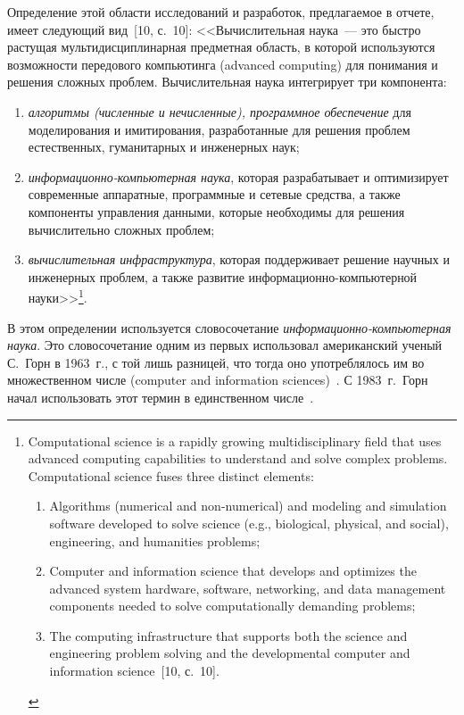 \begin{multicols}{2}
      Определение этой области исследований и разработок, предлагаемое в отчете, имеет
следующий вид~[10, с.~10]: <<Вычислительная наука~--- это быст\-ро растущая
мультидисциплинарная предметная область, в которой используются возможности передового
компьютинга (advanced computing) для понимания и решения сложных проблем.
Вы\-чис\-ли\-тель\-ная наука интегрирует три компонента:
      \begin{enumerate}[(1)]
\item \textit{алгоритмы (численные и нечисленные), про\-грам\-мное обеспечение} для
моделирования и имити\-ро\-ва\-ния, разработанные для решения проблем естественных,
гуманитарных и инженерных \mbox{наук};
\item \textit{информационно-компьютерная наука}, которая разрабатывает и оптимизирует
современные аппаратные, программные и сетевые средства, а также компоненты
управления данными, которые необходимы для решения вычислительно сложных
проблем;
\item \textit{вычислительная инфраструктура}, которая поддерживает решение научных и
инженерных проблем, а также развитие информационно-компью\-тер\-ной
науки>>\footnote{Computational science is a rapidly growing multidisciplinary field that uses advanced
computing capabilities to understand and solve complex problems. Computational science fuses three distinct
elements:
\begin{enumerate}[(1)]
\item Algorithms (numerical and non-numerical) and modeling and simulation software developed to solve
science (e.g., biological, physical, and social), engineering, and humanities problems;
\item Computer and information science that develops and optimizes the advanced system hardware,
software, networking, and data management components needed to solve computationally demanding
problems;
\item The computing infrastructure that supports both the science and engineering problem solving and the
developmental computer and information science~[10, с.~10].
\end{enumerate}}.
\end{enumerate}

В этом определении используется словосочетание \textit{ин\-фор\-ма\-ци\-он\-но-ком\-пью\-тер\-ная
наука}. Это словосочетание одним из первых использовал американский ученый С.~Горн в
1963~г., с той лишь
 разни\-цей, что тогда оно употреблялось им во множественном числе
(computer and information sciences)~\cite{1za}. С 1983~г.\ Горн начал использовать этот
термин в единственном числе~\cite{12za}.


\end{multicols}
